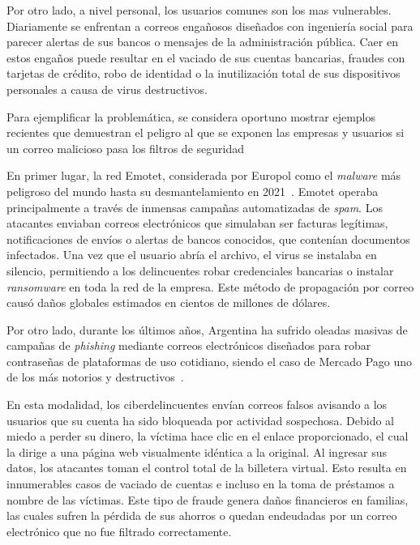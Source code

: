 \documentclass[a4paper,11pt]{book}
\begin{document}
Por otro lado, a nivel personal, los usuarios comunes son los mas vulnerables. Diariamente se enfrentan a correos engañosos diseñados con ingeniería social para parecer alertas de sus bancos o mensajes de la administración pública. Caer en estos engaños puede resultar en el vaciado de sus cuentas bancarias, fraudes con tarjetas de crédito, robo de identidad o la inutilización total de sus dispositivos personales a causa de virus destructivos.

Para ejemplificar la problemática, se considera oportuno mostrar ejemplos recientes que demuestran el peligro al que se exponen las empresas y usuarios si un correo malicioso pasa los filtros de seguridad

En primer lugar, la red Emotet, considerada por Europol como el \textit{malware} más peligroso del mundo hasta su desmantelamiento en 2021~\cite{europol2021emotet}. Emotet operaba principalmente a través de inmensas campañas automatizadas de \textit{spam}. Los atacantes enviaban correos electrónicos que simulaban ser facturas legítimas, notificaciones de envíos o alertas de bancos conocidos, que contenían documentos infectados. Una vez que el usuario abría el archivo, el virus se instalaba en silencio, permitiendo a los delincuentes robar credenciales bancarias o instalar \textit{ransomware} en toda la red de la empresa. Este método de propagación por correo causó daños globales estimados en cientos de millones de dólares.

Por otro lado, durante los últimos años, Argentina ha sufrido oleadas masivas de campañas de \textit{phishing} mediante correos electrónicos diseñados para robar contraseñas de plataformas de uso cotidiano, siendo el caso de Mercado Pago uno de los más notorios y destructivos~\cite{eset2023mercadopago}. 

En esta modalidad, los ciberdelincuentes envían correos falsos avisando a los usuarios que su cuenta ha sido bloqueada por actividad sospechosa. Debido al miedo a perder su dinero, la víctima hace clic en el enlace proporcionado, el cual la dirige a una página web visualmente idéntica a la original. Al ingresar sus datos, los atacantes toman el control total de la billetera virtual. Esto resulta en innumerables casos de vaciado de cuentas e incluso en la toma de préstamos a nombre de las víctimas. Este tipo de fraude genera daños financieros en familias, las cuales sufren la pérdida de sus ahorros o quedan endeudadas por un correo electrónico que no fue filtrado correctamente.
\end{document}
